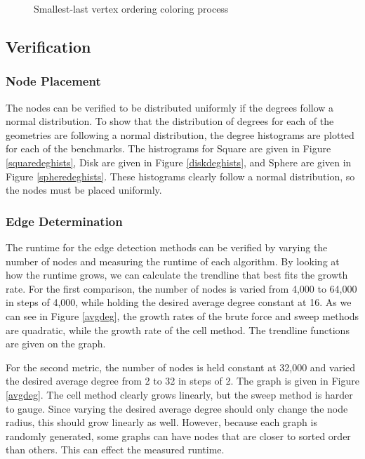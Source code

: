 \documentclass{article}
\begin{document}
\begin{figure}
            \caption{Smallest-last vertex ordering coloring process}
            \label{wtbackbone}
        \end{figure}

    \subsection{Verification}

        \subsubsection{Node Placement}
        The nodes can be verified to be distributed uniformly if the degrees follow a normal distribution. To show that the distribution of degrees for each of the geometries are following a normal distribution, the degree histograms are plotted for each of the benchmarks. The histrograms for Square are given in Figure \ref{squaredeghists}, Disk are given in Figure \ref{diskdeghists}, and Sphere are given in Figure \ref{spheredeghists}. These histograms clearly follow a normal distribution, so the nodes must be placed uniformly.

        \subsubsection{Edge Determination}
        The runtime for the edge detection methods can be verified by varying the number of nodes and measuring the runtime of each algorithm. By looking at how the runtime grows, we can calculate the trendline that best fits the growth rate. For the first comparison, the number of nodes is varied from 4,000 to 64,000 in steps of 4,000, while holding the desired average degree constant at 16. As we can see in Figure \ref{avgdeg}, the growth rates of the brute force and sweep methods are quadratic, while the growth rate of the cell method. The trendline functions are given on the graph.
        \par
        For the second metric, the number of nodes is held constant at 32,000 and varied the desired average degree from 2 to 32 in steps of 2. The graph is given in Figure \ref{avgdeg}. The cell method clearly grows linearly, but the sweep method is harder to gauge. Since varying the desired average degree should only change the node radius, this should grow linearly as well. However, because each graph is randomly generated, some graphs can have nodes that are closer to sorted order than others. This can effect the measured runtime.
\end{document}
